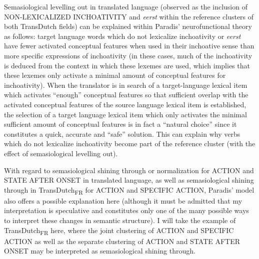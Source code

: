 Semasiological levelling out in translated language (observed as the inclusion of NON-LEXICALIZED INCHOATIVITY and \textit{eerst} within the reference clusters of both TransDutch fields) can be explained within Paradis’ neurofunctional theory as follows: target language words which do not lexicalize inchoativity or \textit{eerst} have fewer activated conceptual features when used in their inchoative sense than more specific expressions of inchoativity (in these cases, much of the inchoativity is deduced from the context in which these lexemes are used, which implies that these lexemes only activate a minimal amount of conceptual features for inchoativity). When the translator is in search of a target-language lexical item which activates ``enough'' conceptual features so that sufficient overlap with the activated conceptual features of the source language lexical item is established, the selection of a target language lexical item which only activates the minimal sufficient amount of conceptual features is in fact a ``natural choice'' since it constitutes a quick, accurate and ``safe'' solution. This can explain why verbs which do not lexicalize inchoativity become part of the reference cluster (with the effect of semasiological levelling out).

With regard to semasiological shining through or normalization for ACTION and STATE AFTER ONSET in translated language, as well as semasiological shining through in TransDutch\textsubscript{FR} for ACTION and SPECIFIC ACTION, Paradis’ model also offers a possible explanation here (although it must be admitted that my interpretation is speculative and constitutes only one of the many possible ways to interpret these changes in semantic structure). I will take the example of TransDutch\textsubscript{FR} here, where the joint clustering of ACTION and SPECIFIC ACTION as well as the separate clustering of ACTION and STATE AFTER ONSET may be interpreted as semasiological shining through.

